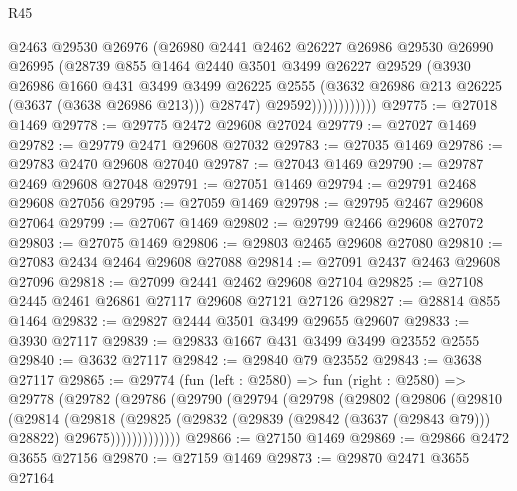 \begin{lexlean}{R45}
\begin{coremodule}
                        @2463
                        @29530
                        @26976
                        (@26980
                          @2441
                          @2462
                          @26227
                          @26986
                          @29530
                          @26990
                          @26995
                          (@28739
                            @855
                            @1464
                            @2440
                            @3501
                            @3499
                            @26227
                            @29529
                            (@3930
                              @26986
                              @1660
                              @431
                              @3499
                              @3499
                              @26225
                              @2555
                              (@3632 @26986 @213 @26225 (@3637 (@3638 @26986 @213)))
                              @28747)
                            @29592))))))))))))
@29775 := @27018 @1469
@29778 := @29775 @2472 @29608 @27024
@29779 := @27027 @1469
@29782 := @29779 @2471 @29608 @27032
@29783 := @27035 @1469
@29786 := @29783 @2470 @29608 @27040
@29787 := @27043 @1469
@29790 := @29787 @2469 @29608 @27048
@29791 := @27051 @1469
@29794 := @29791 @2468 @29608 @27056
@29795 := @27059 @1469
@29798 := @29795 @2467 @29608 @27064
@29799 := @27067 @1469
@29802 := @29799 @2466 @29608 @27072
@29803 := @27075 @1469
@29806 := @29803 @2465 @29608 @27080
@29810 := @27083 @2434 @2464 @29608 @27088
@29814 := @27091 @2437 @2463 @29608 @27096
@29818 := @27099 @2441 @2462 @29608 @27104
@29825 := @27108 @2445 @2461 @26861 @27117 @29608 @27121 @27126
@29827 := @28814 @855 @1464
@29832 := @29827 @2444 @3501 @3499 @29655 @29607
@29833 := @3930 @27117
@29839 := @29833 @1667 @431 @3499 @3499 @23552 @2555
@29840 := @3632 @27117
@29842 := @29840 @79 @23552
@29843 := @3638 @27117
@29865 := @29774
    (fun (left : @2580) =>
    fun (right : @2580) =>
    @29778
      (@29782
        (@29786
          (@29790
            (@29794
              (@29798
                (@29802
                  (@29806
                    (@29810
                      (@29814
                        (@29818
                          (@29825
                            (@29832
                              (@29839 (@29842 (@3637 (@29843 @79))) @28822)
                              @29675)))))))))))))
@29866 := @27150 @1469
@29869 := @29866 @2472 @3655 @27156
@29870 := @27159 @1469
@29873 := @29870 @2471 @3655 @27164

\end{coremodule}
\end{lexlean}
